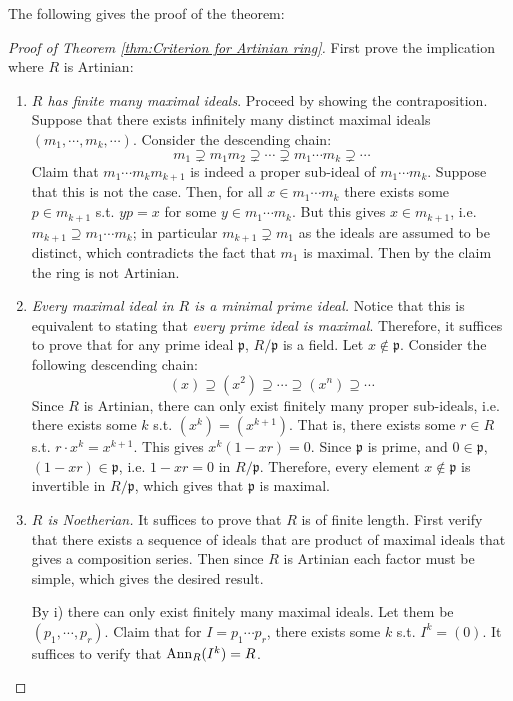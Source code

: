 The following gives the proof of the theorem:\

\begin{proof}[Proof of Theorem \ref{thm:Criterion for Artinian ring}]
    First prove the implication where $R$ is Artinian:
    \begin{enumerate}[label=\roman*)]
        \item \emph{$R$ has finite many maximal ideals}. Proceed by showing the contraposition. Suppose that there exists infinitely many distinct maximal ideals $(m_1, \cdots, m_k, \cdots)$. Consider the descending chain:
        \[
            m_1 \supsetneq m_1 m_2 \supsetneq \cdots \supsetneq m_1\cdots m_k \supsetneq \cdots
        \]
        Claim that $m_1\cdots m_k m_{k+1}$ is indeed a proper sub-ideal of $m_1\cdots m_k$. Suppose that this is not the case. Then, for all $x\in m_1\cdots m_k$ there exists some $p\in m_{k+1}$ s.t. $yp = x$ for some $y\in m_1\cdots m_k$. But this gives $x\in m_{k+1}$, i.e. $m_{k+1} \supseteq m_1\cdots m_k$; in particular $m_{k+1} \supsetneq m_1$ as the ideals are assumed to be distinct, which contradicts the fact that $m_1$ is maximal. Then by the claim the ring is not Artinian.
        \item \emph{Every maximal ideal in $R$ is a minimal prime ideal.} Notice that this is equivalent to stating that \emph{every prime ideal is maximal}. Therefore, it suffices to prove that for any prime ideal $\mathfrak{p}$, $R/\mathfrak{p}$ is a field. Let $x\notin \mathfrak{p}$. Consider the following descending chain:
        \[
            (x) \supseteq (x^2) \supseteq \cdots \supseteq (x^n) \supseteq \cdots
        \]
        Since $R$ is Artinian, there can only exist finitely many proper sub-ideals, i.e. there exists some $k$ s.t. $(x^k) = (x^{k+1})$. That is, there exists some $r\in R$ s.t. $r\cdot x^k = x^{k+1}$. This gives $x^k(1 - xr) = 0$. Since $\mathfrak{p}$ is prime, and $0\in\mathfrak{p}$, $(1 - xr) \in \mathfrak{p}$, i.e. $1 - xr = 0$ in $R/\mathfrak{p}$. Therefore, every element $x\notin \mathfrak{p}$ is invertible in $R/\mathfrak{p}$, which gives that $\mathfrak{p}$ is maximal.
        \item \emph{$R$ is Noetherian.} It suffices to prove that $R$ is of finite length. First verify that there exists a sequence of ideals that are product of maximal ideals that gives a composition series. Then since $R$ is Artinian each factor must be simple, which gives the desired result.
        
        By i) there can only exist finitely many maximal ideals. Let them be $(p_1, \cdots, p_r)$. Claim that for $I = p_1\cdots p_r$, there exists some $k$ s.t. $I^k = (0)$. It suffices to verify that $\mathrm{Ann}_{R}(I^k) = R$. 


\end{enumerate}
\end{proof}
